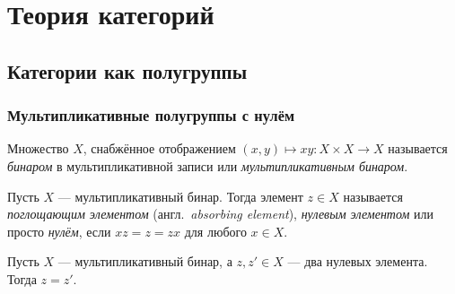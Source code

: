 \documentclass[
	extrafontsizes,
	11pt,
	hyphens,
]{memoir}
\begin{document}
%



\chapter{Теория категорий}


\section{Категории как полугруппы}

\subsection{Мультипликативные полугруппы с нулём}

\begin{definition}
Множество \(X\), снабжённое отображением \((x,y) \mapsto xy : X \times X \to X\) называется \emph{бинаром} в мультипликативной записи или \emph{мультипликативным бинаром}.
\end{definition}

\begin{definition}
Пусть \(X\) --- мультипликативный бинар.
\label{def:MultSemigrZero}
Тогда элемент \(z \in X\) называется \emph{поглощающим элементом} (англ.\ \emph{\textenglish{absorbing element}}), \emph{нулевым элементом} или просто \emph{нулём}, если \(xz = z = zx\) для любого \(x \in X\).
\end{definition}

\begin{theorem}
Пусть \(X\) --- мультипликативный бинар, а \(z, z' \in X\) --- два нулевых элемента. Тогда \(z = z'\).
\end{theorem}
\end{document}
